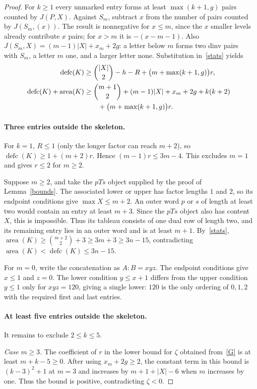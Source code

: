 \documentclass[11pt]{article}
\DeclareMathOperator{\area}{area}\DeclareMathOperator{\dinv}{dinv}
\DeclareMathOperator{\defc}{defc}\DeclareMathOperator{\sym}{sym}
\begin{document}
\begin{proof}
For $k\ge1$ every unmarked entry forms at least $\max(k+1,g)$ pairs counted by $J(P,X)$. Against $S_m$, subtract $x$ from the number of pairs counted by $J(S_m,(x))$. The result is nonnegative for $x\le m$, since the $x$ smaller levels already contribute $x$ pairs; for $x>m$ it is $-(x-m-1)$. Also $J(S_m,X)=(m-1)|X|+x_m+2g$: a letter below $m$ forms two dinv pairs with $S_m$, a letter $m$ one, and a larger letter none. Substitution in~\eqref{stats} yields
\begin{align}
 \defc(K)&\ge \binom{|X|}{2}-h-R+\bigl(m+\max(k+1,g)\bigr)r,\label{D}\\
 \defc(K)+\area(K)&\ge \binom{m+1}2+(m-1)|X|+x_m+2g+k(k+2)\notag\\
             &\qquad+\bigl(m+\max(k+1,g)\bigr)r.\label{G}
\end{align}

\paragraph{Three entries outside the skeleton.} For $k=1$, $R\le1$ (only the longer factor can reach $m+2$), so $\defc(K)\ge1+(m+2)r$. Hence $(m-1)r\le3m-4$. This excludes $m=1$ and gives $r\le2$ for $m\ge2$.

Suppose $m\ge2$, and take the $pTs$ object supplied by the proof of Lemma~\ref{bounds}. The associated lower or upper has factor lengths $1$ and $2$, so its endpoint conditions give $\max X\le m+2$. An outer word $p$ or $s$ of length at least two would contain an entry at least $m+3$. Since the $pTs$ object also has content $X$, this is impossible. Thus its tableau consists of one dual row of length two, and its remaining entry lies in an outer word and is at least $m+1$. By~\eqref{stats}, $\area(K)\ge\binom{m+2}2+3\ge3m+3\ge3n-15$, contradicting $\area(K)<\defc(K)\le3n-15$.

For $m=0$, write the concatenation as $A:B=xyz$. The endpoint conditions give $x\le1$ and $z=0$. The lower condition $y\le x+1$ differs from the upper condition $y\le1$ only for $xyz=120$, giving a single lower: $120$ is the only ordering of $0,1,2$ with the required first and last entries.

\paragraph{At least five entries outside the skeleton.} It remains to exclude $2\le k\le5$.

\noindent\emph{Case $m\ge3$.} The coefficient of $r$ in the lower bound for $\zeta$ obtained from~\eqref{G} is at least $m+k-5\ge0$. After using $x_m+2g\ge2$, the constant term in this bound is $(k-3)^2+1$ at $m=3$ and increases by $m+1+|X|-6$ when $m$ increases by one. Thus the bound is positive, contradicting $\zeta<0$.


\end{proof}
\end{document}
